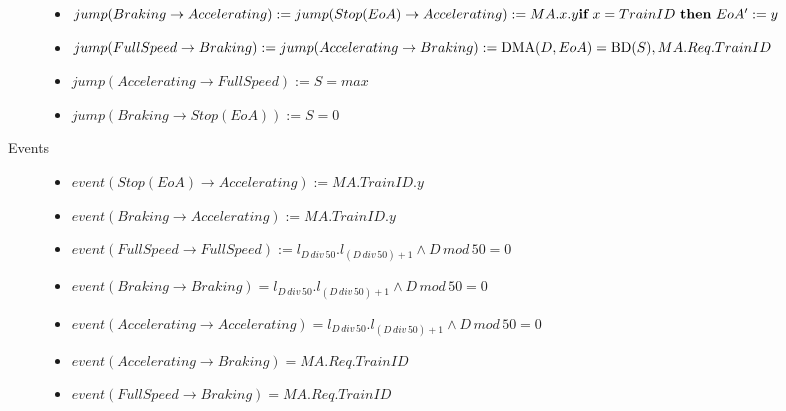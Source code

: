 \begin{mydef}
\begin{description}
\begin{itemize}
	\item  $jump(Braking \to Accelerating) := jump(Stop (EoA) \to Accelerating) := MA.x.y\\ \textbf{if} \ x = TrainID \ \textbf{then} \ EoA' := y$ 
	

	\item $jump(Full Speed \to Braking) := jump(Accelerating \to Braking) := \mathrm{DMA}(D,EoA) = \mathrm{BD}(S), MA.Req.TrainID$


	\item $jump(Accelerating \to Full Speed) := S = max$
	
	\item $jump(Braking \to Stop (EoA)) := S = 0$

	\end{itemize}

\item[Events] \hspace*{0mm}
\begin{itemize}
	\item $event (Stop (EoA) \to Accelerating) := MA.TrainID.y$
	\item $event (Braking \to Accelerating) := MA.TrainID.y$
	\item $event(Full Speed \to Full Speed) := l_{D \, div \, 50}.l_{(D \, div \, 50) +1} \wedge D \, mod \, 50 = 0$
\item $event(Braking \to Braking) = l_{D \, div \, 50}.l_{(D \, div \, 50) +1} \wedge D \, mod \, 50 = 0$
\item $event(Accelerating \to Accelerating) = l_{D \, div \, 50}.l_{(D \, div \, 50) +1} \wedge D \, mod \, 50 = 0$

	\item $event(Accelerating \to Braking) = MA.Req.TrainID$
	\item $event(Full Speed \to Braking) = MA.Req.TrainID$
\end{itemize}

\end{description}
\end{mydef}

